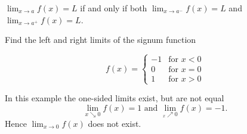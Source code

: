 \documentclass[../main.tex]{subfiles}
\begin{document}
\begin{theorem}
  $\lim_{x \to a} f(x) = L$ if and only if both $\lim_{x \to a^{-}} f(x) =L$ and $\lim_{x \to a^{+}} f(x) = L$.
\end{theorem}

\begin{example}
Find the left and right limits of the signum function

  \begin{minipage}[c]{0.5\textwidth}
    \[
    f(x) =
    \begin{cases}
      -1 & \text{for $x<0$}\\ 0 & \text{for $x=0$}\\ 1 & \text{for $x>0$}
    \end{cases}
    \]
  \end{minipage}
  \begin{minipage}[c]{0.2\textwidth}
    \begin{figure}[H]
    \centering
    
    \end{figure}
  \end{minipage}

  In this example the one-sided limits exist, but are not equal
  \[
  \lim_{x\searrow0}f(x) = 1 \text{ and } \lim_{_x\nearrow0}f(x) = -1.
  \]
  Hence $\lim_{x\to 0} f(x)$ does not exist.
\end{example}


%   

\end{document}
